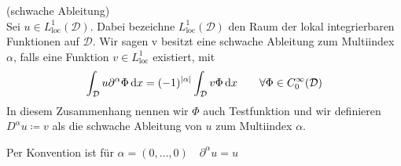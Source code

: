 \begin{Definition}(schwache Ableitung)\\
	Sei $u \in L_{\text{loc}}^1(\mathcal{D})$. Dabei bezeichne $  L_{\text{loc}}^1(\mathcal{D}) $ den Raum der lokal integrierbaren Funktionen auf $ \mathcal{D} $. Wir sagen v besitzt eine schwache Ableitung zum Multiindex $\alpha$, falls eine Funktion $v \in L_{\text{loc}}^1$ existiert, mit 
		\begin{align*}
			\int_{\mathcal{D}} u \partial^{\alpha} \Phi \, \mathrm{d} x = (-1)^{|\alpha|} \int_{\mathcal{D}} v \Phi \, \mathrm{d} x \qquad \forall \Phi \in C_0^{\infty}(\mathcal{D})
		\end{align*}
	In diesem Zusammenhang nennen wir $\Phi$ auch Testfunktion und wir definieren $D^{\alpha} u \coloneqq v$ als die schwache Ableitung von $u$ zum Multiindex $\alpha$. 
\end{Definition}
\begin{Bemerkung}
	Per Konvention ist für $ \alpha = (0,\dots, 0) \quad \partial^{\alpha}u = u $
\end{Bemerkung}
